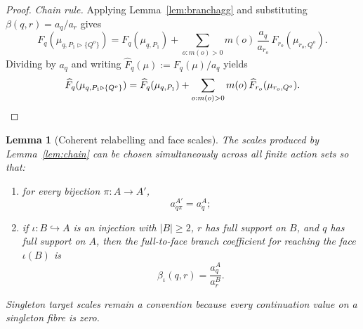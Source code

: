 \documentclass[11pt,a4paper]{article}
\newtheorem{lemma}[theorem]{Lemma}
\theoremstyle{definition}
\newcommand{\1}{\mathbf 1}
\begin{document}
\begin{proof}
\emph{Chain rule.}  Applying Lemma~\ref{lem:branchagg} and substituting $\beta(q,r)=a_q/a_r$ gives
\[
F_q(\mu_{q,P_1\triangleright\{Q^o\}})
=
F_q(\mu_{q,P_1})+\sum_{o:m(o)>0}m(o)\,\frac{a_q}{a_{r_o}}\,F_{r_o}(\mu_{r_o,Q^o}).
\]
Dividing by $a_q$ and writing $\widehat F_q(\mu):=F_q(\mu)/a_q$ yields
\[
\widehat F_q(\mu_{q,P_1\triangleright\{Q^o\}})
=
\widehat F_q(\mu_{q,P_1})+\sum_{o:m(o)>0}m(o)\,\widehat F_{r_o}(\mu_{r_o,Q^o}).
\qedhere
\]
\end{proof}

\begin{lemma}[Coherent relabelling and face scales]\label{lem:facescales}
The scales produced by Lemma~\ref{lem:chain} can be chosen simultaneously across all finite action sets so that:
\begin{enumerate}
\item for every bijection $\pi:A\to A'$,
\[
a^{A'}_{q\pi}=a^A_q;
\]
\item if $\iota:B\hookrightarrow A$ is an injection with $|B|\ge2$, $r$ has full support on $B$, and $q$ has full support
on $A$, then the full-to-face branch coefficient for reaching the face $\iota(B)$ is
\begin{equation}
\beta_\iota(q,r)=\frac{a^A_q}{a^B_r}.
\tag{FS}\label{eq:facescale}
\end{equation}
\end{enumerate}
Singleton target scales remain a convention because every continuation value on a singleton fibre is zero.
\end{lemma}
\end{document}
